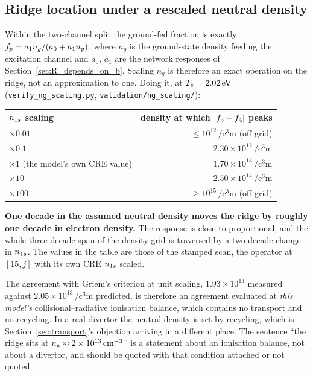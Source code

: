 \subsection{Ridge location under a rescaled neutral density}

Within the two-channel split the ground-fed fraction is exactly
$f_{p} = a_1 n_g/(a_0 + a_1 n_g)$, where $n_g$ is the ground-state density
feeding the excitation channel and $a_0$, $a_1$ are the network responses of
Section~\ref{sec:R_depends_on_b}. Scaling $n_g$ is therefore an exact operation
on the ridge, not an approximation to one. Doing it, at
$T_e = \SI{2.02}{\electronvolt}$ (\texttt{verify\_ng\_scaling.py},
\texttt{validation/ng\_scaling/}):

\begin{center}
\begin{tabular}{lr}
  \toprule
  $n_{1s}$ scaling & density at which $|f_{3}-f_{4}|$ peaks \\
  \midrule
  $\times 0.01$ & $\le 10^{12}\,\si{\per\cubic\centi\metre}$ (off grid) \\
  $\times 0.1$  & $2.30\times10^{12}\,\si{\per\cubic\centi\metre}$ \\
  $\times 1$ (the model's own CRE value) & $1.70\times10^{13}\,\si{\per\cubic\centi\metre}$ \\
  $\times 10$   & $2.50\times10^{14}\,\si{\per\cubic\centi\metre}$ \\
  $\times 100$  & $\ge 10^{15}\,\si{\per\cubic\centi\metre}$ (off grid) \\
  \bottomrule
\end{tabular}
\end{center}

\noindent \textbf{One decade in the assumed neutral density moves the ridge by
roughly one decade in electron density.} The response is close to
proportional, and the whole three-decade span of the density grid is traversed
by a two-decade change in $n_{1s}$. The values in the table are those of the
stamped scan, the operator at $[15,j]$ with its own CRE $n_{1s}$ scaled.

The agreement with Griem's criterion at unit scaling, $1.93\times10^{13}$
measured against $2.05\times10^{13}\,\si{\per\cubic\centi\metre}$ predicted, is
therefore an agreement evaluated at \emph{this model's} collisional--radiative
ionisation balance, which contains no transport and no recycling. In a real
divertor the neutral density is set by recycling, which is
Section~\ref{sec:transport}'s objection arriving in a different place. The
sentence ``the ridge sits at
$n_e \approx 2\times10^{13}\,\si{\per\cubic\centi\metre}$'' is a statement about
an ionisation balance, not about a divertor, and should be quoted with that
condition attached or not quoted.

